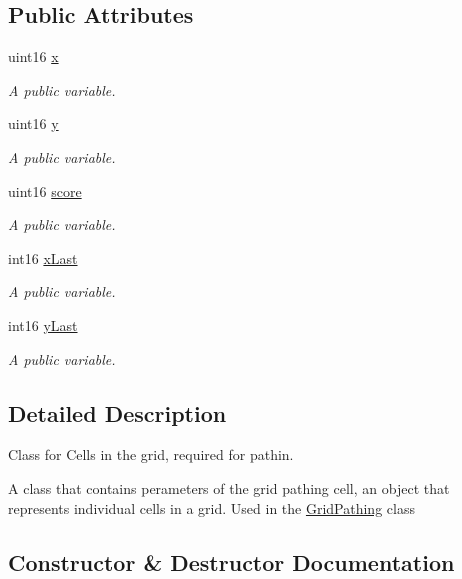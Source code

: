 \subsection*{Public Attributes}
\begin{DoxyCompactItemize}
\item 
uint16 \hyperlink{class_grid_pathing_cell_a489c6c82b1ba484e9f9145c00ec165c0}{x}
\begin{DoxyCompactList}\small\item\em A public variable. \end{DoxyCompactList}\item 
uint16 \hyperlink{class_grid_pathing_cell_a32de04e3614f2e37622a281fdbc24d66}{y}
\begin{DoxyCompactList}\small\item\em A public variable. \end{DoxyCompactList}\item 
uint16 \hyperlink{class_grid_pathing_cell_ab4d6783c766e718c20b173a89fe8e74d}{score}
\begin{DoxyCompactList}\small\item\em A public variable. \end{DoxyCompactList}\item 
int16 \hyperlink{class_grid_pathing_cell_a3b2f9ec49d3e8a2aa3588eda310c8029}{x\+Last}
\begin{DoxyCompactList}\small\item\em A public variable. \end{DoxyCompactList}\item 
int16 \hyperlink{class_grid_pathing_cell_a3a1c2724f3308954f52f77c09d7d6d62}{y\+Last}
\begin{DoxyCompactList}\small\item\em A public variable. \end{DoxyCompactList}\end{DoxyCompactItemize}


\subsection{Detailed Description}
Class for Cells in the grid, required for pathin. 

A class that contains perameters of the grid pathing cell, an object that represents individual cells in a grid. Used in the \hyperlink{class_grid_pathing}{Grid\+Pathing} class 

\subsection{Constructor \& Destructor Documentation}
\hypertarget{class_grid_pathing_cell_acbe865cb1e21ae9e22fda91a6eac7a57}{}\label{class_grid_pathing_cell_acbe865cb1e21ae9e22fda91a6eac7a57} 
